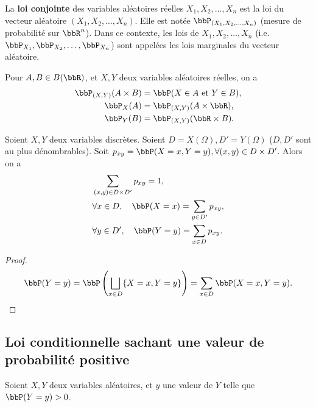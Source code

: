 \begin{deff}
    La \textbf{loi conjointe} des variables aléatoires réelles $X_1, X_2, \ldots, X_n$
    est la loi du vecteur aléatoire $(X_1, X_2, \ldots, X_n)$.
    Elle est notée $\bbP_{(X_1, X_2, \ldots, X_n)}$ (mesure de probabilité sur $\bbR^n$).
    Dans ce contexte, les lois de $X_1, X_2, \ldots, X_n$ (i.e. $\bbP_{X_1}, \bbP_{X_2}, \ldots, \bbP_{X_n}$)
    sont appelées les lois marginales du vecteur aléatoire.
\end{deff}

\begin{exer}
    Pour $A, B \in B(\bbR)$, et $X, Y$ deux variables aléatoires réelles,
    on a
    \begin{align*}
        \bbP_{(X, Y)} (A \times B) & = \bbP(X \in A \text{ et } Y \in B), \\
        \bbP_X(A)                  & = \bbP_{(X, Y)}(A \times \bbR),      \\
        \bbP_Y(B)                  & = \bbP_{(X, Y)}(\bbR \times B).
    \end{align*}
\end{exer}

\begin{rqq}
    Soient $X, Y$ deux variables discrètes.
    Soient $D = X(\Omega), D' = Y(\Omega)$ ($D, D'$ sont au plus dénombrables).
    Soit $p_{xy} = \bbP(X = x, Y = y), \forall (x, y) \in D \times D'$.
    Alors on a
    \begin{align*}
         & \sum_{(x, y) \in D \times D'} p_{xy} = 1,                    \\
         & \forall x \in D, \quad \bbP(X = x) = \sum_{y \in D'} p_{xy}, \\
         & \forall y \in D', \quad \bbP(Y = y) = \sum_{x \in D} p_{xy}.
    \end{align*}
\end{rqq}

\begin{proof}
    \[ \bbP(Y = y) = \bbP \left(\bigsqcup_{x \in D} \{ X = x, Y = y \}\right) = \sum_{x \in D} \bbP(X = x, Y = y). \qedhere \]
\end{proof}

\subsection{Loi conditionnelle sachant une valeur de probabilité positive}

Soient $X, Y$ deux variables aléatoires, et $y$ une valeur de $Y$ telle que $\bbP(Y = y) > 0$.

